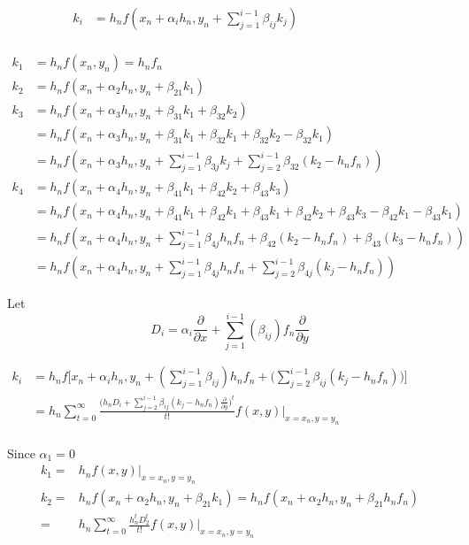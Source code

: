 \documentclass[12 pt]{article}
\begin{document}
\begin{align*}
	k_{i} &= h_{n}f(x_{n}+\alpha_{i}h_{n}, y_{n}+\sum_{j=1}^{i-1}\beta_{ij}k_{j}) &   &   &   &    &     &	&	 & 	&\\
\end{align*}

\begin{align*}
	k_{1} &= h_{n}f(x_{n}, y_{n}) = h_{n}f_{n}\\ 
	k_{2} &= h_{n}f(x_{n}+\alpha_{2}h_{n}, y_{n}+\beta_{21}k_{1})\\
	k_{3} &= h_{n}f(x_{n}+\alpha_{3}h_{n}, y_{n} + \beta_{31}k_{1} + \beta_{32}k_{2})\\
		  &= h_{n}f(x_{n}+\alpha_{3}h_{n}, y_{n} + \beta_{31}k_{1} + \beta_{32}k_{1} + \beta_{32}k_{2} - \beta_{32}k_{1})\\
		  &= h_{n}f(x_{n} + \alpha_{3}h_{n}, y_{n}+\sum_{j = 1}^{i-1}\beta_{3j}k_{j} + \sum_{j=2}^{i-1}\beta_{32}(k_{2}-h_{n}f_{n}))\\
	k_{4} &= h_{n}f(x_{n}+\alpha_{4}h_{n}, y_{n} + \beta_{41}k_{1} + \beta_{42}k_{2} + \beta_{43}k_{3})\\
		  &=  h_{n}f(x_{n}+\alpha_{4}h_{n}, y_{n} + \beta_{41}k_{1} + \beta_{42}k_{1} + \beta_{43}k_{1} + \beta_{42}k_{2} + \beta_{43}k_{3} - \beta_{42}k_{1} - \beta_{43}k_{1})\\
		  &= h_{n}f(x_{n} + \alpha_{4}h_{n}, y_{n} + \sum_{j = 1}^{i-1}\beta_{4j}h_{n}f_{n} + \beta_{42}(k_{2} - h_{n}f_{n}) + \beta_{43}(k_{3}-h_{n}f_{n}))\\
		  &= h_{n}f(x_{n} + \alpha_{4}h_{n}, y_{n} + \sum_{j = 1}^{i-1}\beta_{4j}h_{n}f_{n} + \sum_{j=2}^{i-1}\beta_{4j}(k_{j}-h_{n}f_{n}))
\end{align*}

Let {\large $$D_{i} = \alpha_{i}\frac{\partial}{\partial x} + \sum_{j = 1}^{i - 1} (\beta_{ij})f_{n}\frac{\partial}{\partial y}$$}


\begin{align*}
	k_{i} &= h_{n}f\bigg[x_{n}+\alpha_{i}h_{n}, y_{n}+(\sum_{j=1}^{i-1}\beta_{ij})h_{n}f_{n} + \bigg(\sum_{j=2}^{i-1}\beta_{ij}(k_{j}-h_{n}f_{n})\bigg)\bigg] &    &     &     &	  &		&   &    &	  &\\
	      &= h_{n}\sum_{t=0}^{\infty}\frac{\bigg(h_{n}D_{i}+\sum_{j=2}^{i-1}\beta_{ij}(k_{j}-h_{n}f_{n})\frac{\partial}{\partial y}\bigg)^{t}}{t!}f(x,y)\big\vert_{x = x_{n}, y= y_{n}} &    &     &	 &		&	   &    &	  &     &\\
\end{align*}

{
\large
Since $\alpha_{1} = 0$ 
\begin{equation}
\begin{split}
k_{1} =& h_{n}f(x,y)\big\vert_{x = x_{n}, y= y_{n}}\\
k_{2} =& h_{n}f(x_{n}+\alpha_{2}h_{n},y_{n}+\beta_{21}k_{1})=h_{n}f(x_{n}+\alpha_{2}h_{n},y_{n}+\beta_{21}h_{n}f_{n})\\
      =& h_{n} \sum_{t=0}^{\infty}\frac{h_{n}^{t}D_{2}^{t}}{t!}f(x,y)\big\vert_{x = x_{n}, y= y_{n}}\\     
\end{split}
\end{equation}
}
\end{document}

